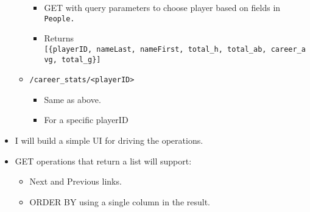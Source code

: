 \documentclass[11pt]{article}
\providecommand{\tightlist}{%
      \setlength{\itemsep}{0pt}\setlength{\parskip}{0pt}}
\begin{document}
\begin{itemize}
\begin{itemize}
    \begin{itemize}
    \tightlist
    \item
      GET with query parameters to choose player based on fields in
      \texttt{People.}
    \item
      Returns
      \texttt{{[}\{playerID,\ nameLast,\ nameFirst,\ total\_h,\ total\_ab,\ career\_avg,\ total\_g\}{]}}
    \end{itemize}
  \item
    \texttt{/career\_stats/\textless{}playerID\textgreater{}}

    \begin{itemize}
    \tightlist
    \item
      Same as above.
    \item
      For a specific playerID
    \end{itemize}
  \end{itemize}
\item
  I will build a simple UI for driving the operations.
\item
  GET operations that return a list will support:

  \begin{itemize}
  \tightlist
  \item
    Next and Previous links.
  \item
    ORDER BY using a single column in the result.
  \end{itemize}
\end{itemize}


    
    
    
    
\end{document}
